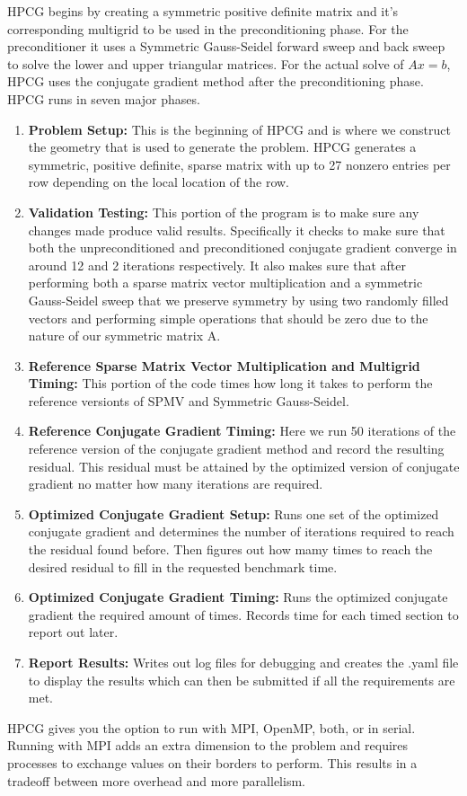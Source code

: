 \documentclass{ccr15}
\begin{document}
HPCG begins by creating a symmetric positive definite matrix and it's corresponding multigrid
to be used in the preconditioning phase. For the preconditioner it uses a Symmetric Gauss-Seidel
forward sweep and back sweep to solve the lower and upper triangular matrices. For the actual
solve of $A x = b$, HPCG uses the conjugate gradient method after the preconditioning phase.
HPCG runs in seven major phases.
\begin{enumerate}
\item \textbf{Problem Setup:} This is the beginning of HPCG and is where we construct the
geometry that is used to generate the problem. HPCG generates a symmetric, positive definite,
sparse matrix with up to 27 nonzero entries per row depending on the local location of the row.
\item \textbf{Validation Testing:} This portion of the program is to make sure any changes
made produce valid results. Specifically it checks to make sure that both the unpreconditioned
and preconditioned conjugate gradient converge in around 12 and 2 iterations respectively. It
also makes sure that after performing both a sparse matrix vector multiplication and a symmetric
Gauss-Seidel sweep that we preserve symmetry by using two randomly filled vectors and
performing simple operations that should be zero due to the nature of our symmetric matrix A.
\item \textbf{Reference Sparse Matrix Vector Multiplication and Multigrid Timing:} This
portion of the code times how long it takes to perform the reference versionts of SPMV and
Symmetric Gauss-Seidel.
\item \textbf{Reference Conjugate Gradient Timing:} Here we run 50 iterations of the reference
version of the conjugate gradient method and record the resulting residual. This residual must be
attained by the optimized version of conjugate gradient no matter how many iterations are
required.
\item \textbf{Optimized Conjugate Gradient Setup:} Runs one set of the optimized conjugate
gradient and determines the number of iterations required to reach the residual found before.
Then figures out how mamy times to reach the desired residual to fill in the requested benchmark
time.
\item \textbf{Optimized Conjugate Gradient Timing:} Runs the optimized conjugate gradient the
required amount of times. Records time for each timed section to report out later.
\item \textbf{Report Results:} Writes out log files for debugging and creates the .yaml file
to display the results which can then be submitted if all the requirements are met.
\end{enumerate}
HPCG gives you the option to run with MPI, OpenMP, both, or in serial. Running with MPI adds an
extra dimension to the problem and requires processes to exchange values on their borders to
perform. This results in a tradeoff between more overhead and more parallelism.
\end{document}
